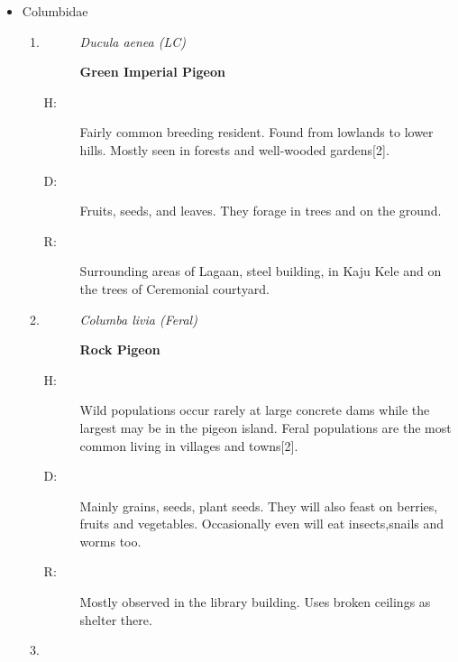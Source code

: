 \begin{itemize}
\begin{enumerate}
\begin{description}
\item[H: ]%
Common breeding resident throughout the Island.Prefers paddyfields, scurb, marshes and reeds as habitat{[}2{]}.%
\item[D: ]%
Diet consists almost entirely of small invertebrates, primarily ants, beetles, caterpillars, grasshoppers, spiders, and flies%
\item[R: ]%
Boat Yard and Open area behing the Boat Yard.%
\end{description}%
\end{enumerate}%
\item%
Columbidae%
\begin{enumerate}%
\item%
\begin{description}%
\item[]%
\textit{Ducula aenea (LC)}%
\item[]%
\textbf{Green Imperial Pigeon}%
\end{description}%
\begin{description}%
\item[H: ]%
Fairly common breeding resident. Found from lowlands to lower hills. Mostly seen in forests and well{-}wooded gardens{[}2{]}.%
\item[D: ]%
Fruits, seeds, and leaves. They forage in trees and on the ground.%
\item[R: ]%
Surrounding areas of Lagaan, steel building, in Kaju Kele and on the trees of Ceremonial courtyard.%
\end{description}%
\item%
\begin{description}%
\item[]%
\textit{Columba livia (Feral)}%
\item[]%
\textbf{Rock Pigeon}%
\end{description}%
\begin{description}%
\item[H: ]%
Wild populations occur rarely at large concrete dams while the largest may be in the pigeon island. Feral populations are the most common living in villages and towns{[}2{]}.%
\item[D: ]%
Mainly grains, seeds, plant seeds. They will also feast on berries, fruits and vegetables. Occasionally even will eat insects,snails and worms too.%
\item[R: ]%
Mostly observed in the library building. Uses broken ceilings as shelter there.%
\end{description}%
\item%

\end{enumerate}
\end{itemize}
